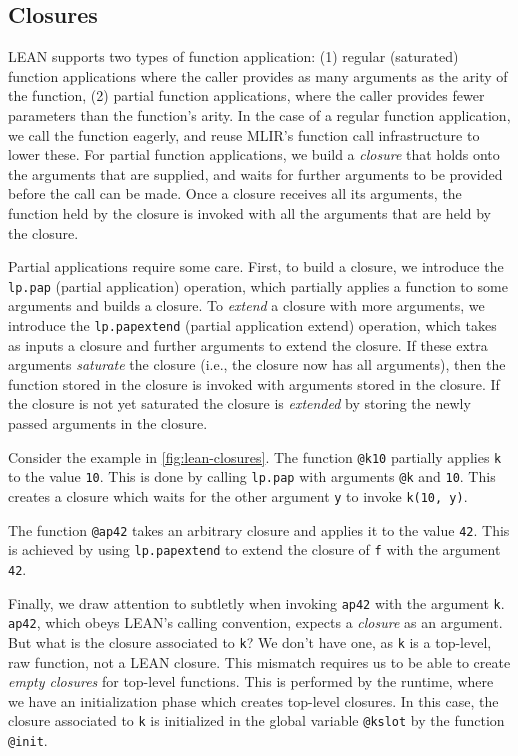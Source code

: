 \documentclass[conference]{IEEEtran}
\newcommand{\lppap}{\textcolor{pairedTwoDarkBlue}{\texttt{lp.pap}}}
\newcommand{\lppapextend}{\textcolor{pairedTwoDarkBlue}{\texttt{lp.papextend}}}
\begin{document}
\subsection{Closures}

LEAN supports two types of function application: (1) regular (saturated) function applications where the caller
provides as many arguments as the arity of the function,
(2) partial function applications, where the caller provides fewer parameters than the function's arity.
In the case of a regular function application, we call the function eagerly, and reuse MLIR's function call infrastructure
to lower these. For partial
function applications, we build a \emph{closure} that holds onto the arguments that are supplied, and waits
for further arguments to be provided before the call can be made.
Once a closure receives all its arguments, the function held by
the closure is invoked with all the arguments that are held by the closure.



Partial applications require some care. First, to build a closure, we introduce the \lppap{} (partial application)
operation, which partially applies a function to some
arguments and builds a closure. To \emph{extend} a closure with more arguments, we introduce the
\lppapextend{} (partial application extend) operation, which takes as inputs a closure
and further arguments to extend the closure.  If these extra arguments
\emph{saturate} the closure (i.e., the closure now has all arguments), then
the function stored in the closure is invoked with arguments stored in the closure.
If the closure is not yet saturated the closure is \emph{extended} by storing the newly passed arguments in the closure.

Consider the example in \autoref{fig:lean-closures}. The function \texttt{@k10} partially applies \texttt{k} to the value \texttt{10}.
This is done by calling \lppap{} with arguments \texttt{@k} and \texttt{10}. This creates a closure which waits for the other argument \texttt{y} to invoke \texttt{k(10, y)}.

The function \texttt{@ap42} takes an arbitrary closure and applies it to the value \texttt{42}. This is achieved by using \lppapextend{} to extend
the closure of \texttt{f} with the argument \texttt{42}.

Finally, we draw attention to subtletly when invoking
\texttt{ap42} with the argument \texttt{k}. \texttt{ap42}, which obeys LEAN's
calling convention, expects a \emph{closure} as an argument.
But what is the closure associated
to \texttt{k}? We don't have one, as \texttt{k} is a top-level, raw
function, not a LEAN closure. This mismatch requires us to be able
to create \emph{empty closures} for top-level functions. This is
performed by the runtime, where we have an initialization phase
which creates top-level closures. In this case, the closure associated to \texttt{k} is initialized in the global variable
\texttt{@kslot} by the function \texttt{@init}.
\end{document}
